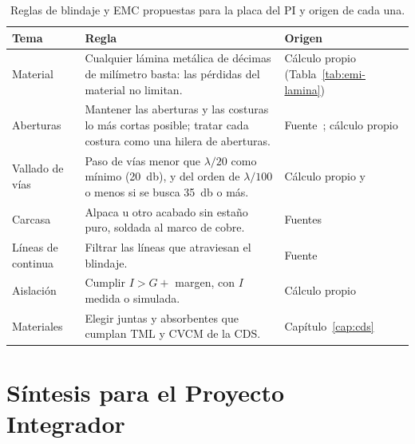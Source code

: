 \begin{table}[H]
  \centering
  \caption[Reglas de blindaje y EMC propuestas.]{Reglas de blindaje y EMC propuestas para la placa del PI y origen de cada una.}\label{tab:emi-reglas}
  \begin{tabular}{@{}>{\raggedright\arraybackslash}p{3.1cm}>{\raggedright\arraybackslash}p{7.2cm}>{\raggedright\arraybackslash}p{4.3cm}@{}}
    \toprule
    Tema & Regla & Origen \\
    \midrule
    Material & Cualquier lámina metálica de décimas de milímetro basta: las pérdidas del material no limitan. & Cálculo propio (Tabla~\ref{tab:emi-lamina}) \\
    Aberturas & Mantener las aberturas y las costuras lo más cortas posible; tratar cada costura como una hilera de aberturas. & Fuente~\cite{rosehulman}; cálculo propio \\
    Vallado de vías & Paso de vías menor que $\lambda/20$ como mínimo (\SI{20}{\decibel}), y del orden de $\lambda/100$ o menos si se busca \SI{35}{\decibel} o más. & Cálculo propio y~\cite{rfessentialsbls} \\
    Carcasa & Alpaca u otro acabado sin estaño puro, soldada al marco de cobre. & Fuentes~\cite{brusse,rfessentialsbls} \\
    Líneas de continua & Filtrar las líneas que atraviesan el blindaje. & Fuente~\cite{rfessentialsbls} \\
    Aislación & Cumplir $I > G +$ margen, con $I$ medida o simulada. & Cálculo propio \\
    Materiales & Elegir juntas y absorbentes que cumplan TML y CVCM de la CDS\@. & Capítulo~\ref{cap:cds} \\
    \bottomrule
  \end{tabular}
\end{table}

\section{Síntesis para el Proyecto Integrador}\label{sec:termica-sintesis}

